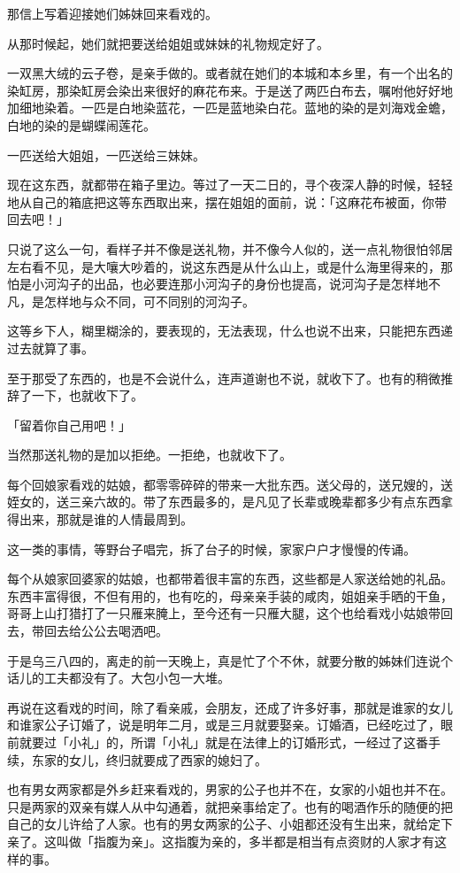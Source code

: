 \documentclass[UTF8]{ctexart}
\begin{document}
那信上写着迎接她们姊妹回来看戏的。

从那时候起，她们就把要送给姐姐或妹妹的礼物规定好了。

一双黑大绒的云子卷，是亲手做的。或者就在她们的本城和本乡里，有一个出名的染缸房，那染缸房会染出来很好的麻花布来。于是送了两匹白布去，嘱咐他好好地加细地染着。一匹是白地染蓝花，一匹是蓝地染白花。蓝地的染的是刘海戏金蟾，白地的染的是蝴蝶闹莲花。

一匹送给大姐姐，一匹送给三妹妹。

现在这东西，就都带在箱子里边。等过了一天二日的，寻个夜深人静的时候，轻轻地从自己的箱底把这等东西取出来，摆在姐姐的面前，说：「这麻花布被面，你带回去吧！」

只说了这么一句，看样子并不像是送礼物，并不像今人似的，送一点礼物很怕邻居左右看不见，是大嚷大吵着的，说这东西是从什么山上，或是什么海里得来的，那怕是小河沟子的出品，也必要连那小河沟子的身份也提高，说河沟子是怎样地不凡，是怎样地与众不同，可不同别的河沟子。

这等乡下人，糊里糊涂的，要表现的，无法表现，什么也说不出来，只能把东西递过去就算了事。

至于那受了东西的，也是不会说什么，连声道谢也不说，就收下了。也有的稍微推辞了一下，也就收下了。

「留着你自己用吧！」

当然那送礼物的是加以拒绝。一拒绝，也就收下了。

每个回娘家看戏的姑娘，都零零碎碎的带来一大批东西。送父母的，送兄嫂的，送姪女的，送三亲六故的。带了东西最多的，是凡见了长辈或晚辈都多少有点东西拿得出来，那就是谁的人情最周到。

这一类的事情，等野台子唱完，拆了台子的时候，家家户户才慢慢的传诵。

每个从娘家回婆家的姑娘，也都带着很丰富的东西，这些都是人家送给她的礼品。东西丰富得很，不但有用的，也有吃的，母亲亲手装的咸肉，姐姐亲手晒的干鱼，哥哥上山打猎打了一只雁来腌上，至今还有一只雁大腿，这个也给看戏小姑娘带回去，带回去给公公去喝洒吧。

于是乌三八四的，离走的前一天晚上，真是忙了个不休，就要分散的姊妹们连说个话儿的工夫都没有了。大包小包一大堆。

再说在这看戏的时间，除了看亲戚，会朋友，还成了许多好事，那就是谁家的女儿和谁家公子订婚了，说是明年二月，或是三月就要娶亲。订婚酒，已经吃过了，眼前就要过「小礼」的，所谓「小礼」就是在法律上的订婚形式，一经过了这番手续，东家的女儿，终归就要成了西家的媳妇了。

也有男女两家都是外乡赶来看戏的，男家的公子也并不在，女家的小姐也并不在。只是两家的双亲有媒人从中勾通着，就把亲事给定了。也有的喝酒作乐的随便的把自己的女儿许给了人家。也有的男女两家的公子、小姐都还没有生出来，就给定下亲了。这叫做「指腹为亲」。这指腹为亲的，多半都是相当有点资财的人家才有这样的事。
\end{document}
